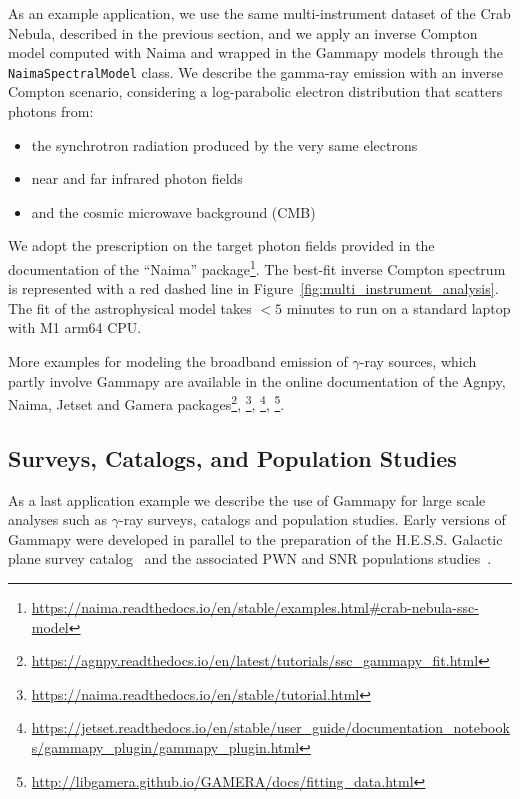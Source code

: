 \documentclass[longauth]{aa}
\newcommand{\code}[1]{\texttt{#1}}
\newcommand{\gammapy}{Gammapy\xspace}
\newcommand{\hess}{H.E.S.S.\xspace}
\newcommand{\gammaray}{$\gamma$-ray\xspace}
\begin{document}
As an example application, we use the same multi-instrument
dataset of the Crab Nebula, described in the previous section,
and we apply an inverse
Compton model computed with Naima and wrapped in the \gammapy models
through the \code{NaimaSpectralModel} class. We describe the gamma-ray emission 
with an inverse Compton scenario, considering a log-parabolic
electron distribution that scatters photons from:
%
\begin{itemize}
        \item the synchrotron radiation produced by
        the very same electrons
        \item near and far infrared photon fields
        \item and the cosmic microwave background (CMB)
\end{itemize}
%
We adopt the prescription on the target photon fields provided in the documentation of the \enquote{Naima}
package\footnote{\url{https://naima.readthedocs.io/en/stable/examples.html\#crab-nebula-ssc-model}}.
The best-fit inverse Compton spectrum is represented with a red dashed line in
Figure~\ref{fig:multi_instrument_analysis}. The fit of the astrophysical model
takes $<5$ minutes to run on a standard laptop with M1 arm64 CPU.

More examples for modeling the broadband emission of \gammaray sources, which 
partly involve \gammapy are available in the online documentation of the
Agnpy, Naima, Jetset and Gamera packages\footnote{\url{https://agnpy.readthedocs.io/en/latest/tutorials/ssc\_gammapy\_fit.html}},
\footnote{\url{https://naima.readthedocs.io/en/stable/tutorial.html}}, 
\footnote{\url{https://jetset.readthedocs.io/en/stable/user\_guide/documentation\_notebooks/gammapy\_plugin/gammapy\_plugin.html}},
\footnote{\url{http://libgamera.github.io/GAMERA/docs/fitting\_data.html}}.



\subsection{Surveys, Catalogs, and Population Studies}
\label{ssec:surveys-catalogs-and-population-studies}
As a last application example we describe the use of \gammapy for large scale
analyses such as \gammaray surveys, catalogs and population studies.
Early versions of \gammapy were developed in parallel to the preparation of
the \hess Galactic plane survey catalog~\citep[HGPS, ][]{2018A&A...612A...1H} and
the associated PWN and SNR populations studies~\citep{2018A&A...612A...2H,2018A&A...612A...3H}. 
\end{document}
